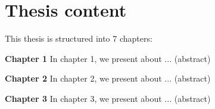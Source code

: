 \section{Thesis content}
\label{sec:thesis_content}

This thesis is structured into 7 chapters:

\textbf{Chapter 1}
In chapter 1, we present about ... (abstract)

\textbf{Chapter 2}
In chapter 2, we present about ... (abstract)

\textbf{Chapter 3}
In chapter 3, we present about ... (abstract)